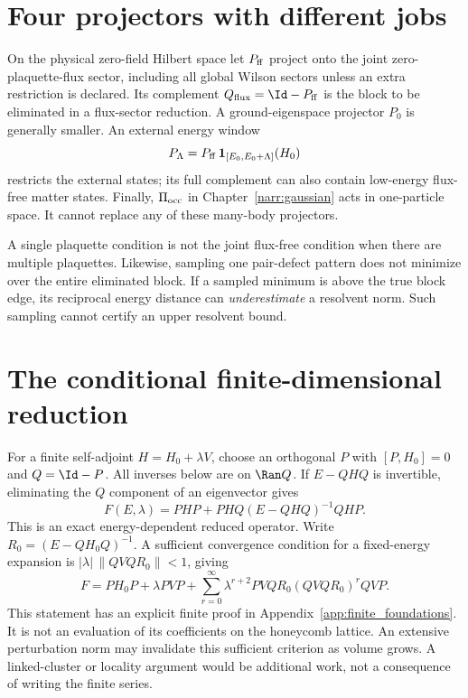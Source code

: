 \section{Four projectors with different jobs}
On the physical zero-field Hilbert space let $P_{\rm ff}$ project onto the joint
zero-plaquette-flux sector, including all global Wilson sectors unless an extra
restriction is declared. Its complement $Q_{\rm flux}=\Id-P_{\rm ff}$ is the
block to be eliminated in a flux-sector reduction. A ground-eigenspace projector
$P_0$ is generally smaller. An external energy window
\begin{equation}
 P_\Lambda=P_{\rm ff}\,\mathbf1_{[E_0,E_0+\Lambda]}(H_0)
\end{equation}
restricts the external states; its full complement can also contain low-energy
flux-free matter states. Finally, $\Pi_{\rm occ}$ in
Chapter~\ref{narr:gaussian} acts in one-particle space. It cannot replace any
of these many-body projectors.

A single plaquette condition is not the joint flux-free condition when there
are multiple plaquettes. Likewise, sampling one pair-defect pattern does not
minimize over the entire eliminated block. If a sampled minimum is above the
true block edge, its reciprocal energy distance can \emph{underestimate} a
resolvent norm. Such sampling cannot certify an upper resolvent bound.

\section{The conditional finite-dimensional reduction}
For a finite self-adjoint $H=H_0+\lambda V$, choose an orthogonal $P$ with
$[P,H_0]=0$ and $Q=\Id-P$. All inverses below are on $\Ran Q$. If
$E-QHQ$ is invertible, eliminating the $Q$ component of an eigenvector gives
\begin{equation}
 F(E,\lambda)=PHP+PHQ(E-QHQ)^{-1}QHP.
 \label{eq:narr:feshbach}
\end{equation}
This is an exact energy-dependent reduced operator. Write
$R_0=(E-QH_0Q)^{-1}$. A sufficient convergence condition for a fixed-energy
expansion is $|\lambda|\,\|QVQ R_0\|<1$, giving
\begin{equation}
 F=PH_0P+\lambda PVP+
 \sum_{r=0}^{\infty}\lambda^{r+2}PVQ R_0(QVQ R_0)^r QVP.
 \label{eq:narr:neumann}
\end{equation}
This statement has an explicit finite proof in Appendix~\ref{app:finite_foundations}.
It is not an evaluation of its coefficients on the honeycomb lattice.
An extensive perturbation norm may invalidate this sufficient criterion as
volume grows. A linked-cluster or locality argument would be additional work,
not a consequence of writing the finite series.


